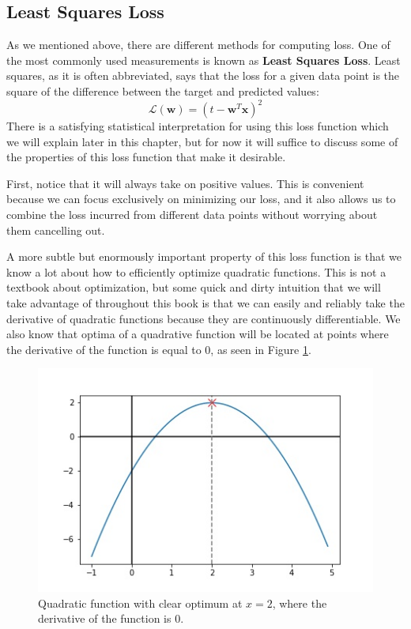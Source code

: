 \subsection{Least Squares Loss}
As we mentioned above, there are different methods for computing loss. One of the most commonly used measurements is known as \textbf{Least Squares Loss}. Least squares, as it is often abbreviated, says that the loss for a given data point is the square of the difference between the target and predicted values:
\begin{equation} \label{least-squares-loss-fn}
    \mathcal{L}(\textbf{w}) = (t - \textbf{w}^{T}\textbf{x})^2
\end{equation}
There is a satisfying statistical interpretation for using this loss function which we will explain later in this chapter, but for now it will suffice to discuss some of the properties of this loss function that make it desirable.

First, notice that it will always take on positive values. This is convenient because we can focus exclusively on minimizing our loss, and it also allows us to combine the loss incurred from different data points without worrying about them cancelling out.

A more subtle but enormously important property of this loss function is that we know a lot about how to efficiently optimize quadratic functions. This is not a textbook about optimization, but some quick and dirty intuition that we will take advantage of throughout this book is that we can easily and reliably take the derivative of quadratic functions because they are continuously differentiable. We also know that optima of a quadrative function will be located at points where the derivative of the function is equal to 0, as seen in Figure \ref{fig:quad-deriv-at-2}.

\begin{figure}
    \centering
    \includegraphics[width=0.5\paperwidth]{../LinearRegression/fig/deriv_at_2_GEN.jpg}
    \caption{Quadratic function with clear optimum at $x=2$, where the derivative of the function is 0.}
    \label{fig:quad-deriv-at-2}
\end{figure}

